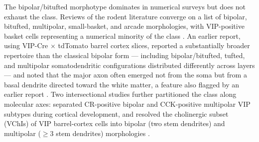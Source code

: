 \documentclass[11pt]{article}
\begin{document}
The bipolar/bitufted morphotype dominates in numerical surveys but does not exhaust the class. Reviews of the rodent literature converge on a list of bipolar, bitufted, multipolar, small-basket, and arcade morphologies, with VIP-positive basket cells representing a numerical minority of the class \citep{Rudy2011, Cauli2014, Apicella2022, Fishell2020}. An earlier report, using VIP-Cre $\times$ tdTomato barrel cortex slices, reported a substantially broader repertoire than the classical bipolar form --- including bipolar/bitufted, tufted, and multipolar somatodendritic configurations distributed differently across layers --- and noted that the major axon often emerged not from the soma but from a basal dendrite directed toward the white matter, a feature also flagged by an earlier report \citep{Kawaguchi1996}. Two intersectional studies further partitioned the class along molecular axes: \citet{Stachniak2021} separated CR-positive bipolar and CCK-positive multipolar VIP subtypes during cortical development, and \citet{Yayon2023} resolved the cholinergic subset (VChIs) of VIP barrel-cortex cells into bipolar (two stem dendrites) and multipolar ($\geq$3 stem dendrites) morphologies \citep{Stachniak2021, Yayon2023, Wong2022, Pronneke2015}.
\end{document}
